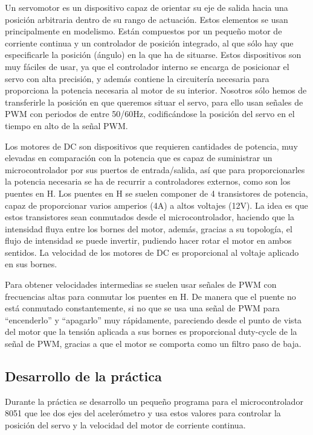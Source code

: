 \documentclass[a4paper, 11pt]{article}
\begin{document}
Un servomotor es un dispositivo capaz de orientar su eje de salida
hacia una posición arbitraria dentro de su rango de actuación.
Estos elementos se usan principalmente en modelismo. Están
compuestos por un pequeño motor de corriente continua y un
controlador de posición integrado, al que sólo hay que
especificarle la posición (ángulo) en la que ha de situarse. Estos
dispositivos son muy fáciles de usar, ya que el controlador interno
se encarga de posicionar el servo con alta precisión, y además
contiene la circuitería necesaria para proporciona la potencia
necesaria al motor de su interior. Nosotros sólo hemos de
transferirle la posición en que queremos situar el servo, para ello
usan señales de PWM con periodos de entre 50/60Hz, codificándose la
posición del servo en el tiempo en alto de la señal PWM.

Los motores de DC son dispositivos que requieren cantidades de
potencia, muy elevadas en comparación con la potencia que es capaz
de suministrar un microcontrolador por sus puertos de
entrada/salida, así que para proporcionarles la potencia necesaria
se ha de recurrir a controladores externos, como son los puentes en
H. Los puentes en H se suelen componer de 4 transistores de
potencia, capaz de proporcionar varios amperios (4A) a altos
voltajes (12V). La idea es que estos transistores sean conmutados
desde el microcontrolador, haciendo que la intensidad fluya entre
los bornes del motor, además, gracias a su topología, el flujo de
intensidad se puede invertir, pudiendo hacer rotar el motor en
ambos sentidos. La velocidad de los motores de DC es proporcional
al voltaje aplicado en sus bornes.

Para obtener velocidades intermedias se suelen usar señales de PWM
con frecuencias altas para conmutar los puentes en H. De manera que
el puente no está conmutado constantemente, si no que se usa una
señal de PWM para ``encenderlo'' y ``apagarlo'' muy rápidamente,
pareciendo desde el punto de vista del motor que la tensión
aplicada a sus bornes es proporcional duty-cycle de la señal de
PWM, gracias a que el motor se comporta como un filtro paso de
baja.

\subsection{Desarrollo de la práctica}
Durante la práctica se desarrollo un pequeño programa para el
microcontrolador 8051 que lee dos ejes del acelerómetro y usa estos
valores para controlar la posición del servo y la velocidad del
motor de corriente continua.
\inputminted[tabsize=4, fontsize=\small]{c}{prac4-main.c}
\end{document}
